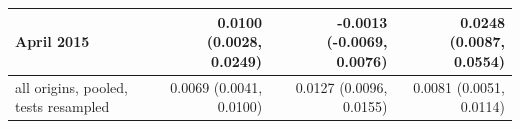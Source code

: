 \begin{tabular}{lrrr}
April 2015 & 0.0100 (0.0028, 0.0249) & -0.0013 (-0.0069, 0.0076) & 0.0248 (0.0087, 0.0554) \\
\midrule
all origins, pooled, tests resampled & 0.0069 (0.0041, 0.0100) & 0.0127 (0.0096, 0.0155) & 0.0081 (0.0051, 0.0114) \\

\end{tabular}
